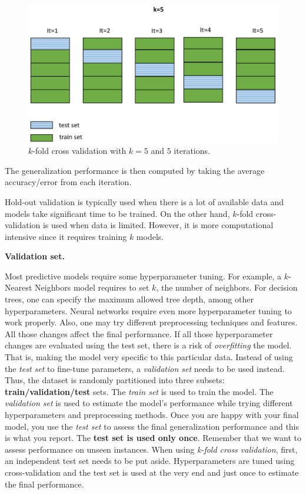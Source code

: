 \documentclass[
  11pt,
]{krantz}
\begin{document}
\begin{figure}

{\centering \includegraphics[width=0.9\linewidth]{images/crossvalidation} 

}

\caption{\(k\)-fold cross validation with \(k=5\) and \(5\) iterations.}\label{fig:crossvalidation}
\end{figure}

The generalization performance is then computed by taking the average accuracy/error from each iteration.

Hold-out validation is typically used when there is a lot of available data and models take significant time to be trained. On the other hand, \(k\)-fold cross-validation is used when data is limited. However, it is more computational intensive since it requires training \(k\) models.

\textbf{Validation set.}

Most predictive models require some hyperparameter tuning. For example, a \(k\)-Nearest Neighbors model requires to set \(k\), the number of neighbors. For decision trees, one can specify the maximum allowed tree depth, among other hyperparameters. Neural networks require even more hyperparameter tuning to work properly. Also, one may try different preprocessing techniques and features. All those changes affect the final performance. If all those hyperparameter changes are evaluated using the test set, there is a risk of \emph{overfitting} the model. That is, making the model very specific to this particular data. Instead of using the \emph{test set} to fine-tune parameters, a \emph{validation set} needs to be used instead. Thus, the dataset is randomly partitioned into three subsets: \textbf{train/validation/test} sets. The \emph{train set} is used to train the model. The \emph{validation set} is used to estimate the model's performance while trying different hyperparameters and preprocessing methods. Once you are happy with your final model, you use the \emph{test set} to assess the final generalization performance and this is what you report. The \textbf{test set is used only once}. Remember that we want to assess performance on unseen instances. When using \emph{k-fold cross validation}, first, an independent test set needs to be put aside. Hyperparameters are tuned using cross-validation and the test set is used at the very end and just once to estimate the final performance.
\end{document}
